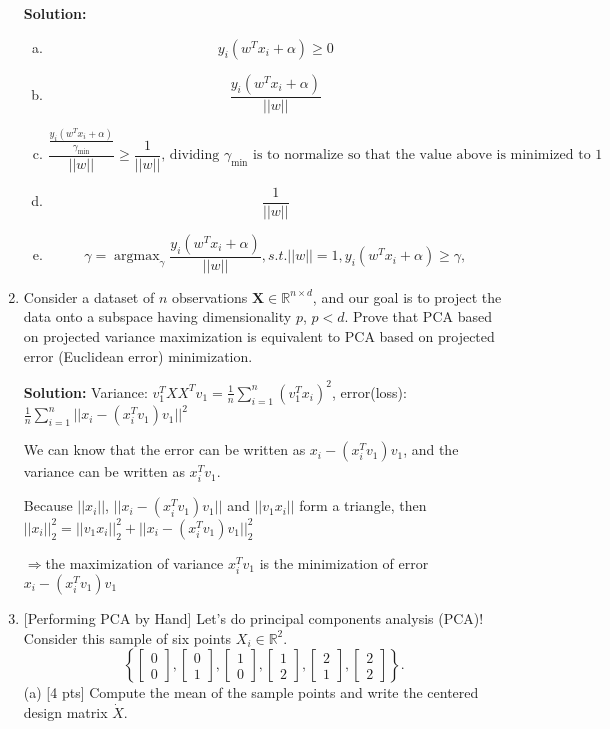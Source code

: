 \documentclass[10pt]{article}
\begin{document}
\begin{enumerate}[1.]
		  \textbf{Solution:}
\begin{enumerate}[(a)]
  \item $$y_i(w^Tx_i+\alpha)\geq0$$
  \item $$\frac{y_i(w^Tx_i+\alpha)}{||w||}$$
  \item $$\frac{\frac{y_i(w^Tx_i+\alpha)}{\gamma_{\min}}}{||w||}\geq\frac{1}{||w||}\mbox{, dividing $\gamma_{\min}$ is to normalize so that the value above is minimized to 1}$$
  \item $$\frac{1}{||w||}$$
  \item $$\gamma=\mathop{\arg\max}_{\gamma}\frac{y_i(w^Tx_i+\alpha)}{||w||},s.t.||w||=1,y_i(w^Tx_i+\alpha)\geq\gamma,$$
\end{enumerate}
	      \newpage 
    \item {} Consider a dataset of $n$ observations $\mathbf{X}\in         \mathbb{R}^{n \times d}$, and our goal is to project the data onto a           subspace having dimensionality $p$, $p<d$. 
	Prove that PCA based on projected variance maximization is equivalent to       PCA based on projected error (Euclidean error) minimization. \par
	\textbf{Solution:}
  Variance: $v_1^TXX^Tv_1=\frac1n\sum_{i=1}^n(v_1^Tx_i)^2$, error(loss): $\frac1n\sum_{i=1}^n||x_i-(x_i^Tv_1)v_1||^2$

  We can know that the error can be written as $x_i-(x_i^Tv_1)v_1$, and the variance can be written as $x_i^Tv_1$.

  Because $||x_i||$, $||x_i-(x_i^Tv_1)v_1||$ and $||v_1x_i||$ form a triangle, then $||x_i||^2_2=||v_1x_i||_2^2+||x_i-(x_i^Tv_1)v_1||_2^2$

  $\Rightarrow$the maximization of variance $x_i^Tv_1$ is the minimization of error $x_i-(x_i^Tv_1)v_1$

	\newpage
 \item {} [Performing PCA by Hand]
 Let's do principal components analysis (PCA)! Consider this sample of six points $X_i \in \mathbb{R}^2$.
$$
\left\{\left[\begin{array}{l}
0 \\
0
\end{array}\right],\left[\begin{array}{l}
0 \\
1
\end{array}\right],\left[\begin{array}{l}
1 \\
0
\end{array}\right],\left[\begin{array}{l}
1 \\
2
\end{array}\right],\left[\begin{array}{l}
2 \\
1
\end{array}\right],\left[\begin{array}{l}
2 \\
2
\end{array}\right]\right\} .
$$
(a) [4 pts] Compute the mean of the sample points and write the centered design matrix $\dot{X}$.


\end{enumerate}
\end{document}
